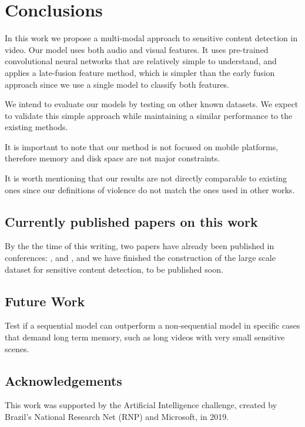 \newpage

\chapter{Conclusions}
\label{chap:conclusions}

In this work we propose a multi-modal approach to sensitive content detection in video. Our model uses both audio and visual features. It uses pre-trained convolutional neural networks that are relatively simple to understand, and  applies a late-fusion feature method, which is simpler than the early fusion approach since we use a single model to classify both features.

We intend to evaluate our models by testing on other known datasets. We expect to validate this simple approach while maintaining a similar performance to the existing methods.

It is important to note that our method is not focused on mobile platforms, therefore memory and disk space are not major constraints. 

It is worth mentioning that our results are not directly comparable to existing ones since our definitions of violence do not match the ones used in other works. 

\section{Currently published papers on this work}
\label{sec:contrib}

By the the time of this writing, two papers have already been published in  conferences: \cite{2019NSFWbaseline}, and \cite{2020PornDetectionSBIE}, and we have finished the construction of the large scale dataset for sensitive content detection, to be published soon.

\section{Future Work}
\label{sec:future}


         
Test if a sequential model can outperform a non-sequential model in specific cases that demand long term memory, such as long videos with very small sensitive scenes.

\section{Acknowledgements}
\label{sec:acks}
This work was supported by the Artificial Intelligence challenge, created by Brazil's National Research Net (RNP) and Microsoft, in 2019.